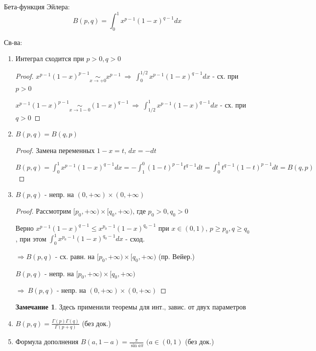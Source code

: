 \documentclass{article}
\theoremstyle{definition}
\numberwithin{theorem}{section}
\numberwithin{lemma}{section}
\numberwithin{definition}{section}
\numberwithin{corollary}{section}
\newtheorem*{remark}{Замечание}
\numberwithin{equation}{section}
\let\implies\Rightarrow
\begin{document}
\begin{definition}
  Бета-функция Эйлера:
  \[
    B(p,q)=\int_{0}^{1}x^{p-1}(1-x)^{q-1}dx
  \]
\end{definition}
Св-ва:
\begin{enumerate}
  \item Интеграл сходится при $p>0,q>0$
    \begin{proof}
      \phantom{.}

      $x^{p-1}(1-x)^{p-1}\underset{x\to +0}{\sim} x^{p-1} \ \implies \ \int_{0}^{1/2}x^{p-1}(1-x)^{q-1}dx$ - сх. при $p>0$

      $x^{p-1}(1-x)^{p-1}\underset{x\to 1-0}{\sim} (1-x)^{q-1} \ \implies \ \int_{1/2}^{1}x^{p-1}(1-x)^{q-1}dx$ - сх. при $q>0$
    \end{proof}
  \item $B(p,q)=B(q,p)$
    \begin{proof}
      \phantom{.}

      Замена переменных $1-x=t$, $dx=-dt$

      $B(p,q)=\int_{0}^{1}x^{p-1}(1-x)^{q-1}dx=-\int_{1}^{0}(1-t)^{p-1}t^{q-1}dt=\int_{0}^{1}t^{q-1}(1-t)^{p-1}dt=B(q,p)$
    \end{proof}
  \item $B(p,q)$ - непр. на $(0,+\infty)\times(0,+\infty)$
    \begin{proof}
      \phantom{.}

      Рассмотрим $[p_0,+\infty)\times[q_0,+\infty)$, где $p_0>0,q_0>0$

      Верно $x^{p-1}(1-x)^{q-1} \le x^{p_0-1}(1-x)^{q_0-1}$ при $x \in (0,1)$, $p\ge p_0, q \ge q_0$,
      при этом $\int_{0}^{1}x^{p_0-1}(1-x)^{q_0-1}dx$ - сход.

      $\implies B(p,q)$ - сх. равн. на $[p_0,+\infty)\times [q_0,+\infty)$ (пр. Вейер.)

      $B(p,q)$ - непр. на $[p_0,+\infty)\times [q_0,+\infty)$
      
      $\implies \ B(p,q)$ - непр. на $(0,+\infty)\times(0,+\infty)$
    \end{proof}
    \begin{remark}
      Здесь применили теоремы для инт., завис. от двух параметров
    \end{remark}
  \item $B(p,q)=\frac{\Gamma(p)\Gamma(q)}{\Gamma(p+q)}$ (без док.)
  \item Формула дополнения $B(a,1-a)=\frac{\pi}{\sin a\pi}$ $(a\in(0,1)$ (без док.)
  
\end{enumerate}
\end{document}
